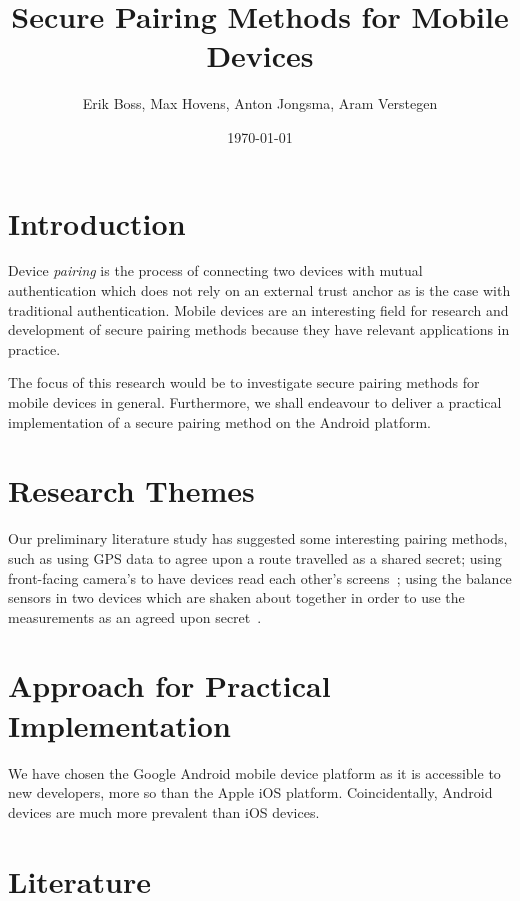 \documentclass{article}
\title{Secure Pairing Methods for Mobile Devices}
\date{\today}
\author{Erik Boss, Max Hovens, Anton Jongsma, Aram Verstegen}
\begin{document}
\begin{abstract}
\end{abstract}

\section{Introduction}

Device \textit{pairing} is the process of connecting two devices with mutual authentication which does not rely on an external trust anchor as is the case with traditional authentication.
Mobile devices are an interesting field for research and development of secure pairing methods because they have relevant applications in practice.

The focus of this research would be to investigate secure pairing methods for mobile devices in general.
Furthermore, we shall endeavour to deliver a practical implementation of a secure pairing method on the Android platform.

\section{Research Themes}
Our preliminary literature study has suggested some interesting pairing methods, such as using GPS data to agree upon a route travelled as a shared secret; %
using front-facing camera's to have devices read each other's screens~\cite{saxena2006secure};
using the balance sensors in two devices which are shaken about together in order to use the measurements as an agreed upon secret~\cite{mayrhofer2009shake}.

\section{Approach for Practical Implementation}

We have chosen the Google Android mobile device platform as it is accessible to new developers, more so than the Apple iOS platform.
Coincidentally, Android devices are much more prevalent than iOS devices.

\section{Literature}



\end{document}
